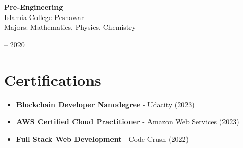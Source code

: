 \documentclass[10pt, letterpaper]{article}
\newenvironment{highlights}{
    \begin{itemize}[
        topsep=0.10 cm,
        parsep=0.10 cm,
        partopsep=0pt,
        itemsep=0pt,
        leftmargin=0.4 cm + 10pt
    ]
}{
    \end{itemize}
}
\newenvironment{threecolentry}[3][]{
    \onecolentry
    \def\thirdColumn{#3}
    \setcolumnwidth{1 cm, \fill, 4.5 cm}
    \begin{paracol}{3}
    {\raggedright #2} \switchcolumn
}{
    \switchcolumn \raggedleft \thirdColumn
    \end{paracol}
    \endonecolentry
}
\begin{document}
\begin{threecolentry}{}{
		2018 – 2020
	}
	\textbf{Pre-Engineering} \\
	Islamia College Peshawar \\
	Majors: Mathematics, Physics, Chemistry
\end{threecolentry}

\section{Certifications}
\begin{highlights}
	\item \textbf{Blockchain Developer Nanodegree} - Udacity (2023)
	\item \textbf{AWS Certified Cloud Practitioner} - Amazon Web Services (2023)
	\item \textbf{Full Stack Web Development} - Code Crush (2022)
\end{highlights}
\end{document}
